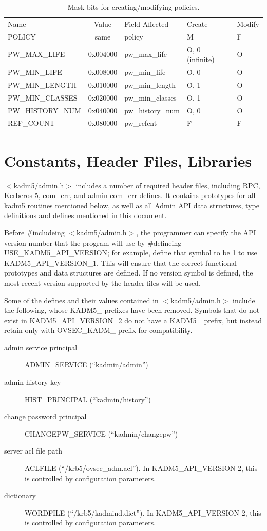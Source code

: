 \begin{table}[htbp]
\begin{tabular}{@{}lclll}
Name & Value & Field Affected & Create & Modify \\
POLICY                  & same     & policy & M & F \\
PW_MAX_LIFE             & 0x004000 & pw_max_life & O, 0 (infinite) & O \\
PW_MIN_LIFE             & 0x008000 & pw_min_life & O, 0 & O \\
PW_MIN_LENGTH           & 0x010000 & pw_min_length & O, 1 & O \\
PW_MIN_CLASSES          & 0x020000 & pw_min_classes & O, 1 & O \\
PW_HISTORY_NUM          & 0x040000 & pw_history_num & O, 0 & O \\
REF_COUNT               & 0x080000 & pw_refcnt & F & F
\end{tabular}
\caption{Mask bits for creating/modifying policies.}
\label{tab:policy-bits}
\end{table}

\section{Constants, Header Files, Libraries}

$<$kadm5/admin.h$>$ includes a number of required header files,
including RPC, Kerberos 5, com_err, and admin com_err
defines.  It contains prototypes for all kadm5 routines mentioned
below, as well as all Admin API data structures, type definitions and
defines mentioned in this document.

Before \v{\#include}ing $<$kadm5/admin.h$>$, the programmer can
specify the API version number that the program will use by
\v{\#define}ing USE_KADM5_API_VERSION; for example, define that symbol
to be 1 to use KADM5_API_VERSION_1.  This will ensure that the correct
functional prototypes and data structures are defined.  If no version
symbol is defined, the most recent version supported by the header
files will be used.

Some of the defines and their values contained in $<$kadm5/admin.h$>$
include the following, whose KADM5_ prefixes have been removed.
Symbols that do not exist in KADM5_API_VERSION_2 do not have a KADM5_
prefix, but instead retain only with OVSEC_KADM_ prefix for
compatibility.
\begin{description}
\item[admin service principal] ADMIN_SERVICE (``kadmin/admin'')
\item[admin history key] HIST_PRINCIPAL (``kadmin/history'')
\item[change password principal] CHANGEPW_SERVICE (``kadmin/changepw'')
\item[server acl file path] ACLFILE (``/krb5/ovsec_adm.acl'').  In
KADM5_API_VERSION 2, this is controlled by configuration parameters.
\item[dictionary] WORDFILE (``/krb5/kadmind.dict'').    In
KADM5_API_VERSION 2, this is controlled by configuration parameters.
\end{description}

